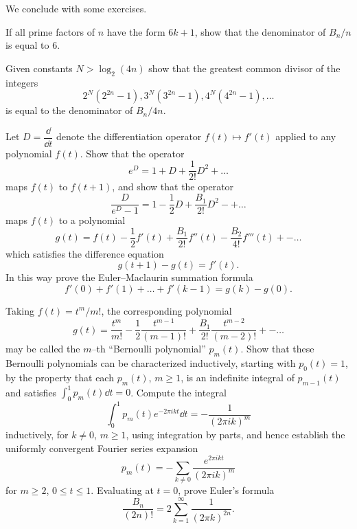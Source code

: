 \documentclass[../main]{subfiles}
\begin{document}
We conclude with some exercises.

\begin{problem}[J. F. Adams]
\label{prob:B-1}
If all prime factors of $n$ have the form $6 k + 1$, show that the denominator of $B_n/n$ is equal to $6$. 
\end{problem}

\begin{problem}[J. F. Adams]
\label{prob:B-2}
Given constants $N > \log_2(4n)$ show that the greatest common divisor of the integers \[2^N(2^{2n} - 1), 3^N(3^{2n} - 1), 4^N(4^{2n} - 1), \ldots\] is equal to the denominator of $B_n/4n$. 
\end{problem}

\begin{problem}
\label{prob:B-3}
Let $D = \dfrac \dd {\dd t}$ denote the differentiation operator $f(t) \mapsto f'(t)$ applied to any polynomial $f(t)$. Show that the operator \[e^D = 1 + D + \frac 1 {2!} D^2 + \ldots\] maps $f(t)$ to $f(t + 1)$, and show that the operator \[\frac D {e^D - 1} = 1 - \frac 1 2 D + \frac {B_1} {2!} D^2 - + \ldots\] maps $f(t)$ to a polynomial \[g(t) = f(t) - \frac 1 2 f'(t) + \frac {B_1} {2!} f''(t) - \frac {B_2} {4!} f'''(t) + - \ldots\] which satisfies the difference equation \[g(t + 1) - g(t) = f'(t).\] In this way prove the Euler--Maclaurin summation formula \[f'(0) + f'(1) + \ldots + f'(k - 1) = g(k) - g(0).\]
\end{problem}

\begin{problem}
\label{prob:B-4}
Taking $f(t) = t^m/m!$, the corresponding polynomial \[g(t) = \dfrac{t^m}{m!} - \frac 1 2 \dfrac{t^{m - 1}}{(m - 1)!} + \frac {B_1} {2!} \dfrac{t^{m - 2}}{(m - 2)!} + - \ldots\] may be called the $m$--th ``Bernoulli polynomial'' $p_m(t)$. Show that these Bernoulli polynomials can be characterized inductively, starting with $p_0(t) = 1$, by the property that each $p_m(t)$, $m \ge 1$, is an indefinite integral of $p_{m - 1}(t)$ and satisfies $\int_0^1 p_m(t) \dd t = 0$. Compute the integral \[\int_0^1 p_m(t) e^{-2 \pi i k t} \dd t = -\dfrac{1}{(2 \pi i k)^m}\] inductively, for $k \ne 0$, $m \ge 1$, using integration by parts, and hence establish the uniformly convergent Fourier series expansion \[p_m(t) = -\sum_{k \ne 0} \dfrac{e^{2 \pi i k t}}{(2 \pi i k)^m}\] for $m \ge 2$, $0 \le t \le 1$. Evaluating at $t = 0$, prove Euler's formula \[\dfrac{B_n}{(2n)!} = 2 \sum_{k = 1}^\infty \dfrac{1}{(2 \pi k)^{2n}}.\]
\end{problem}
\end{document}
